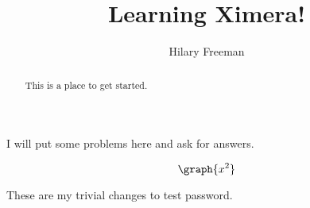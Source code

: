 \documentclass[handout]{ximera}
\title{Learning Ximera!}
\author{Hilary Freeman}
\begin{document}
\begin{abstract}
  This is a place to get started.
\end{abstract}
\maketitle

I will put some problems here and ask for answers.

\[
\graph{x^2}
\]

These are my trivial changes to test password.

\end{document}
